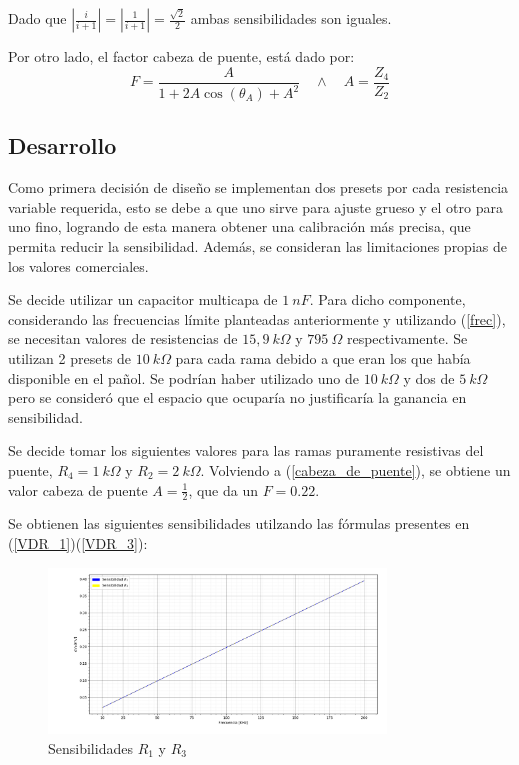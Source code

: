 Dado que $\left|\frac{i}{i+1}\right|=\left|\frac{1}{i+1}\right|=\frac{\sqrt{2}}{2}$ ambas sensibilidades son iguales.


Por otro lado, el factor cabeza de puente, está dado por:
\begin{equation}
F=\frac{A}{1+2A\cos(\theta_A)+A^2} \quad \wedge \quad A=\frac{Z_4}{Z_2}
\label{cabeza_de_puente}
\end{equation} 

\subsection{Desarrollo}

Como primera decisión de diseño se implementan dos presets por cada resistencia variable requerida, esto se debe a que uno sirve para ajuste grueso y el otro para uno fino, logrando de esta manera obtener una calibración más precisa, que permita reducir la sensibilidad. Además, se consideran las limitaciones propias de los valores comerciales.

Se decide utilizar un capacitor multicapa de $1 \ nF$. Para dicho componente, considerando las frecuencias límite planteadas anteriormente y utilizando (\ref{frec}), se necesitan valores de resistencias de $15,9 \ k\Omega$ y $795 \ \Omega$ respectivamente. Se utilizan 2 presets de $10 \ k\Omega$ para cada rama debido a que eran los que había disponible en el pañol. Se podrían haber utilizado uno de $10 \ k\Omega$ y dos de $5 \ k\Omega$ pero se consideró que el espacio que ocuparía no justificaría la ganancia en sensibilidad.

Se decide tomar los siguientes valores para las ramas puramente resistivas del puente, $R_4= 1 \ k\Omega$ y $R_2= 2 \ k\Omega$. Volviendo a (\ref{cabeza_de_puente}), se obtiene un valor cabeza de puente $A=\frac{1}{2}$, que da un $F=0.22$.
\par 


Se obtienen las siguientes sensibilidades utilzando las fórmulas presentes en (\ref{VDR_1})(\ref{VDR_3}):

\begin{figure}[H]
\centering
\includegraphics[width=0.8\textwidth]{Graficos/Sensibilidad}
\caption{Sensibilidades $R_1$ y $R_3$}
\label{fig:Sensibilidades}
\end{figure}


